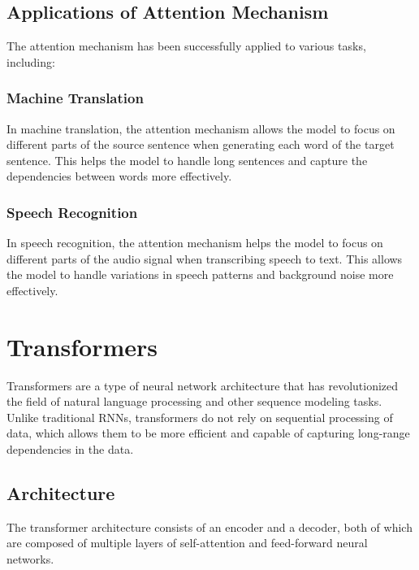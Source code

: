 \documentclass[12pt]{article}
\begin{document}
\subsection{Applications of Attention Mechanism}
The attention mechanism has been successfully applied to various tasks, including:

\subsubsection{Machine Translation}
In machine translation, the attention mechanism allows the model to focus on different parts of the source sentence when generating each word of the target sentence. This helps the model to handle long sentences and capture the dependencies between words more effectively.

\subsubsection{Speech Recognition}
In speech recognition, the attention mechanism helps the model to focus on different parts of the audio signal when transcribing speech to text. This allows the model to handle variations in speech patterns and background noise more effectively.

\section{Transformers}
Transformers are a type of neural network architecture that has revolutionized the field of natural language processing and other sequence modeling tasks. Unlike traditional RNNs, transformers do not rely on sequential processing of data, which allows them to be more efficient and capable of capturing long-range dependencies in the data.

\subsection{Architecture}
The transformer architecture consists of an encoder and a decoder, both of which are composed of multiple layers of self-attention and feed-forward neural networks.
\end{document}
